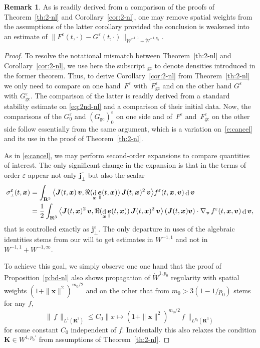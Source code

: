 \documentclass[10pt]{amsart}
\newcommand{\sperp}{{\scriptscriptstyle\perp}}
\newcommand{\blangle}{\bigl\langle}
\newcommand{\brangle}{\bigr\rangle}
\let\eps\varepsilon
\DeclareMathOperator\dD{d}\let\dd\dD
\theoremstyle{plain}
\theoremstyle{definition}
\newtheorem{remark}[theorem]{Remark}
\newcommand\br{\begin{remark}}
\newcommand\er{\end{remark}}
\newcommand\R{\mathbf R}
\newcommand\bJ{{\boldsymbol J}}
\newcommand\bK{{\boldsymbol K}}
\newcommand\bfj{{\boldsymbol j}}
\newcommand\bfv{{\boldsymbol v}}
\newcommand\bfx{{\boldsymbol x}}
\DeclareMathOperator{\beD}{\boldsymbol{e}}
\newcommand\eDpar{\beD_\mypar}
\newcommand{\mypar}{{\mkern3mu\vphantom{\perp}\vrule depth 0pt\mkern2mu\vrule depth 0pt\mkern3mu}}
\begin{document}
\br
As is readily derived from a comparison of the proofs of Theorem~\ref{th:2-nl} and Corollary~\ref{cor:2-nl}, one may remove spatial weights from the assumptions of the latter corollary provided the conclusion is weakened into an estimate of \hbox{$\|F^\eps(t,\cdot)-G^\eps(t,\cdot)\|_{\dot{W}^{-1,1}+\dot{W}^{-1,p_0}}$}.
\er

\begin{proof}
To resolve the notational mismatch between Theorem~\ref{th:2-nl} and Corollary~\ref{cor:2-nl}, we use here the subscript ${}_\mathrm{gc}$ to denote densities introduced in the former theorem. Thus, to derive Corollary~\ref{cor:2-nl} from Theorem~\ref{th:2-nl} we only need to compare on one hand~$F^\eps$ with~$F_\mathrm{gc}^\eps$ and on the other hand $G^\eps$ with $G_\mathrm{gc}^\eps$. The comparison of the latter is readily derived from a standard stability estimate on \eqref{eq:2nd-nl} and a comparison of their initial data. Now, the comparisons of the $G_0^\eps$ and $(G_\mathrm{gc})_0^\eps$ on one side and of~$F^\eps$ and~$F_\mathrm{gc}^\eps$ on the other side follow essentially from the same argument, which is a variation on~\eqref{e:cancel} and its use in the proof of Theorem~\ref{th:2-nl}.

As in \eqref{e:cancel}, we may perform second-order expansions to compare quantities of interest. The only significant change in the expansion is that in the terms of order $\eps$ appear not only $\bfj_\sperp^\eps$ but also the scalar
\begin{align*}
\sigma_\sperp^\eps(t,\bfx)&
=
\int_{\R^3}\,
\blangle\bJ(t,\bfx)\,\bfv,\Re(\dD_\bfx\eDpar(t,\bfx))\,\bJ(t,\bfx)^2\,\bfv\brangle
f^\eps(t,\bfx,\bfv)\dD \bfv\\
&=
\frac12\int_{\R^3}\,
\blangle\bJ(t,\bfx)^2\,\bfv,\Re(\dD_\bfx\eDpar(t,\bfx))\,\bJ(t,\bfx)^2\,\bfv\brangle
\, (\bJ(t,\bfx)\bfv)\cdot\nabla_\bfv\,f^\eps(t,\bfx,\bfv)\dD \bfv,
\end{align*}
that is controlled exactly as $\bfj_\sperp^\eps$. The only departure in uses of the algebraic identities stems from our will to get estimates in $W^{-1,1}$ and not in $W^{-1,1}+W^{-1,\infty}$.

To achieve this goal, we simply observe one one hand that the proof of Proposition~\ref{p:bd-nl} also shows propagation of $\dot{W}^{1,p_0}$ regularity with spatial weights $(1+\|\bfx\|^2)^{m_0/2}$ and on the other that from $m_0>3(1-1/p_0)$ stems for any $f$,\enlargethispage{\baselineskip}%
\[
\|\,f\,\|_{L^1(\R^3)}\leq C_0 \|x\mapsto (1+\|\bfx\|^2)^{m_0/2}\,f\,\|_{L^{p_0}(\R^3)}
\]
for some constant $C_0$ independent of $f$. Incidentally this also relaxes the condition $\bK\in W^{1,p_0'}$ from assumptions of Theorem~\ref{th:2-nl}.
\end{proof}
\end{document}
